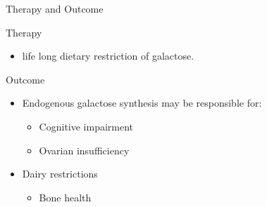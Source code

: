 \documentclass[presentation, smaller]{beamer}
\begin{document}
\begin{frame}[label={sec:orgheadline12}]{Therapy and Outcome}
\begin{block}{Therapy}
\begin{itemize}
\item life long dietary restriction of galactose.
\end{itemize}
\end{block}

\begin{block}{Outcome}
\begin{itemize}
\item Endogenous galactose synthesis may be responsible for:
\begin{itemize}
\item Cognitive impairment
\item Ovarian insufficiency
\end{itemize}
\item Dairy restrictions
\begin{itemize}
\item Bone health
\end{itemize}
\end{itemize}
\end{block}
\end{frame}
\end{document}
